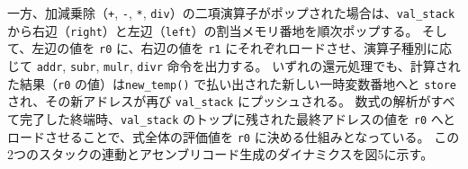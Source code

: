 \documentclass[11pt,a4paper,dvipdfmx]{bxjsarticle}
\begin{document}
一方、加減乗除（\texttt{+}, \texttt{-}, \texttt{*}, \texttt{div}）の二項演算子がポップされた場合は、\texttt{val\_stack} から右辺（\texttt{right}）と左辺（\texttt{left}）の割当メモリ番地を順次ポップする。
そして、左辺の値を \texttt{r0} に、右辺の値を \texttt{r1} にそれぞれロードさせ、演算子種別に応じて \texttt{addr}, \texttt{subr}, \texttt{mulr}, \texttt{divr} 命令を出力する。
いずれの還元処理でも、計算された結果（\texttt{r0} の値）は\texttt{new\_temp()} で払い出された新しい一時変数番地へと \texttt{store} され、その新アドレスが再び \texttt{val\_stack} にプッシュされる。
数式の解析がすべて完了した終端時、\texttt{val\_stack} のトップに残された最終アドレスの値を \texttt{r0} へとロードさせることで、式全体の評価値を \texttt{r0} に決める仕組みとなっている。
この2つのスタックの連動とアセンブリコード生成のダイナミクスを図5に示す。
\end{document}
